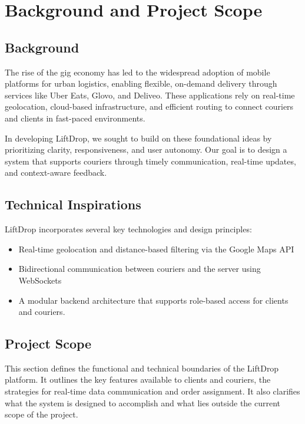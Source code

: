 \section{Background and Project Scope}
\subsection{Background}

The rise of the gig economy has led to the widespread adoption of mobile platforms for urban logistics, enabling flexible, on-demand delivery through services like Uber Eats, Glovo, and Deliveo. These applications rely on real-time geolocation, cloud-based infrastructure, and efficient routing to connect couriers and clients in fast-paced environments.

In developing LiftDrop, we sought to build on these foundational ideas by prioritizing clarity, responsiveness, and user autonomy. Our goal is to design a system that supports couriers through timely communication, real-time updates, and context-aware feedback.

\vspace{2mm}

\subsection*{Technical Inspirations}

LiftDrop incorporates several key technologies and design principles:

\begin{itemize}
    \item Real-time geolocation and distance-based filtering via the Google Maps API
    \item Bidirectional communication between couriers and the server using WebSockets
    \item A modular backend architecture that supports role-based access for clients and couriers.
\end{itemize}

\vspace{2mm}

\subsection{Project Scope}

This section defines the functional and technical boundaries of the LiftDrop platform. It outlines the key features available to clients and couriers, the strategies for real-time data communication and order assignment. It also clarifies what the system is designed to accomplish and what lies outside the current scope of the project.


